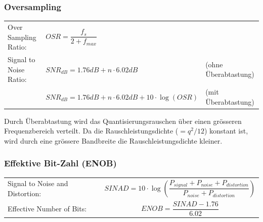 \subsubsection{Oversampling}
  \begin{tabular}{lll}
    Over Sampling Ratio: &
    $OSR = \dfrac{f_s}{2+f_{max}}$ & \\
    
    Signal to Noise Ratio: &
    $SNR_{dB} = 1.76dB + n \cdot 6.02dB$ &
    (ohne Überabtastung)\\
    
    & $SNR_{dB} = 1.76dB + n \cdot 6.02dB + 10 \cdot \log (OSR)$ &
    (mit Überabtastung)
  \end{tabular}
  
  Durch Überabtastung wird das Quantisierungsrauschen über einen grösseren Frequenzbereich verteilt.
  Da die Rauschleistungsdichte ($=q^2/12$) konstant ist, wird durch eine grössere Bandbreite die
  Rauschleistungsdichte kleiner.
  
\subsubsection{Effektive Bit-Zahl (ENOB)}
  \begin{tabular}{lp{8cm}}
    Signal to Noise and Distortion: &
    \[SINAD = 10 \cdot \log \left(\dfrac{P_{signal}+P_{noise}+P_{distortion}}{P_{noise}+P_{distortion}}\right)\] \\
    Effective Number of Bits: &
    \[ENOB = \dfrac{SINAD-1.76}{6.02}\]
  \end{tabular}

  
  


